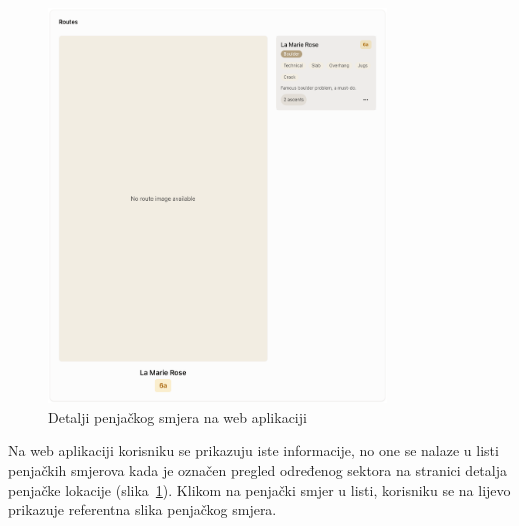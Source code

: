 \begin{figure}[H]
    \centering
    \includegraphics[width=0.8\textwidth]{images/implementacija/web/route-details/route-details.png}
    \caption{Detalji penjačkog smjera na web aplikaciji}
    \label{fig:detalji_smjera_web}
\end{figure}

Na web aplikaciji korisniku se prikazuju iste informacije, no one se nalaze u listi penjačkih smjerova kada je označen pregled određenog sektora na stranici detalja penjačke lokacije (slika~\ref{fig:detalji_smjera_web}). Klikom na penjački smjer u listi, korisniku se na lijevo prikazuje referentna slika penjačkog smjera.

